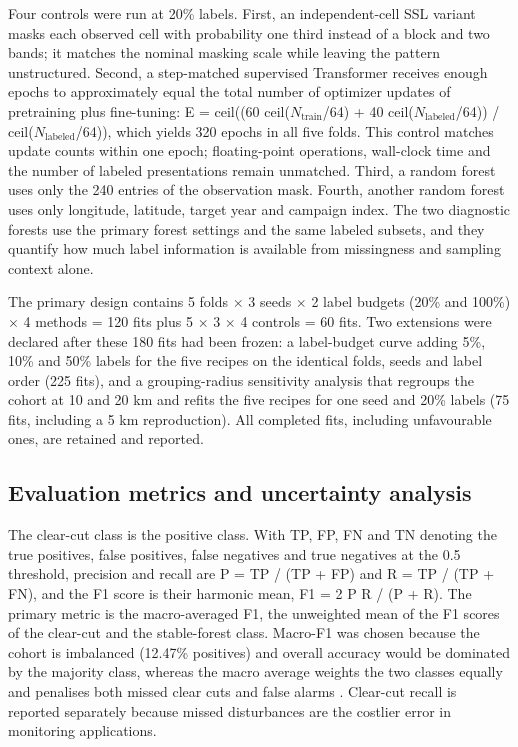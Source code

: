 \documentclass[10pt,a4paper,twocolumn]{article}
\begin{document}
Four controls were run at 20\% labels. First, an independent-cell SSL variant masks each observed cell with probability one third instead of a block and two bands; it matches the nominal masking scale while leaving the pattern unstructured. Second, a step-matched supervised Transformer receives enough epochs to approximately equal the total number of optimizer updates of pretraining plus fine-tuning: E = ceil((60 ceil($N_{\mathrm{train}}$/64) + 40 ceil($N_{\mathrm{labeled}}$/64)) / ceil($N_{\mathrm{labeled}}$/64)), which yields 320 epochs in all five folds. This control matches update counts within one epoch; floating-point operations, wall-clock time and the number of labeled presentations remain unmatched. Third, a random forest uses only the 240 entries of the observation mask. Fourth, another random forest uses only longitude, latitude, target year and campaign index. The two diagnostic forests use the primary forest settings and the same labeled subsets, and they quantify how much label information is available from missingness and sampling context alone.

The primary design contains 5 folds $\times$ 3 seeds $\times$ 2 label budgets (20\% and 100\%) $\times$ 4 methods = 120 fits plus 5 $\times$ 3 $\times$ 4 controls = 60 fits. Two extensions were declared after these 180 fits had been frozen: a label-budget curve adding 5\%, 10\% and 50\% labels for the five recipes on the identical folds, seeds and label order (225 fits), and a grouping-radius sensitivity analysis that regroups the cohort at 10 and 20 km and refits the five recipes for one seed and 20\% labels (75 fits, including a 5 km reproduction). All completed fits, including unfavourable ones, are retained and reported.

\subsection{Evaluation metrics and uncertainty analysis}
The clear-cut class is the positive class. With TP, FP, FN and TN denoting the true positives, false positives, false negatives and true negatives at the 0.5 threshold, precision and recall are P = TP / (TP + FP) and R = TP / (TP + FN), and the F1 score is their harmonic mean, F1 = 2 P R / (P + R). The primary metric is the macro-averaged F1, the unweighted mean of the F1 scores of the clear-cut and the stable-forest class. Macro-F1 was chosen because the cohort is imbalanced (12.47\% positives) and overall accuracy would be dominated by the majority class, whereas the macro average weights the two classes equally and penalises both missed clear cuts and false alarms \cite{ref31}. Clear-cut recall is reported separately because missed disturbances are the costlier error in monitoring applications.
\end{document}
